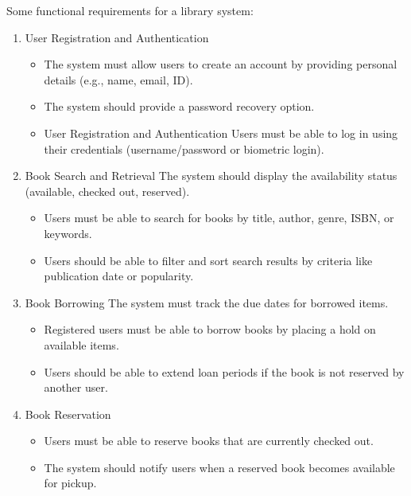 \documentclass[a4paper]{article}
\begin{document}
{\raggedright \begin{large} Some functional requirements for a library system:\end{large}\par }
    \begin{enumerate}[(1)]
        \item User Registration and Authentication 
            \begin{itemize}
                \item  The system must allow users to create an account by providing personal details (e.g., name, email, ID). 
                \item  The system should provide a password recovery option.
                \item  User Registration and Authentication Users must be able to log in using their credentials (username/password or biometric login).
            \end{itemize}
        \item Book Search and Retrieval The system should display the availability status (available, checked out, reserved). 
            \begin{itemize}
                \item  Users must be able to search for books by title, author, genre, ISBN, or keywords. 
                \item  Users should be able to filter and sort search results by criteria like publication date or popularity.
            \end{itemize}
        \item Book Borrowing The system must track the due dates for borrowed items. 
            \begin{itemize}
                \item  Registered users must be able to borrow books by placing a hold on available items. 
                \item  Users should be able to extend loan periods if the book is not reserved by another user.
            \end{itemize}
        \item Book Reservation 
            \begin{itemize}
                \item  Users must be able to reserve books that are currently checked out. 
                \item  The system should notify users when a reserved book becomes available for pickup. 
            \end{itemize}

\end{enumerate}
\end{document}
